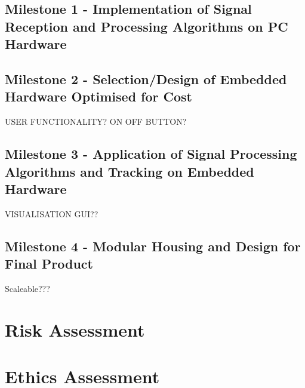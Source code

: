 \documentclass[12pt,a4paper]{article}
\begin{document}
\subsection{Milestone 1 - Implementation of Signal Reception and Processing Algorithms on PC Hardware}
\subsection{Milestone 2 - Selection/Design of Embedded Hardware Optimised for Cost} USER FUNCTIONALITY? ON OFF BUTTON?
\subsection{Milestone 3 - Application of Signal Processing Algorithms and Tracking on Embedded Hardware} VISUALISATION GUI??
\subsection{Milestone 4 - Modular Housing and Design for Final Product} Scaleable???
\section{Risk Assessment}

\section{Ethics Assessment}


\newpage


\end{document}
